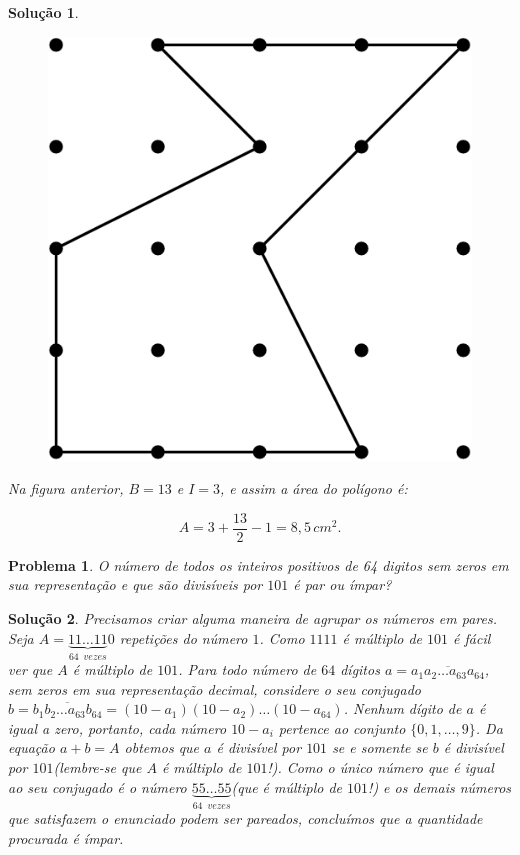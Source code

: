 \documentclass{hipatia}
\newtheorem{problem*}{Problema}
\newtheorem*{solution*}{Solução}
\begin{document}
\begin{solution*}
\begin{figure}[htbp]
	\centering
		\includegraphics[scale=0.3]{F58.png}
\end{figure} 

\noindent Na figura anterior, $B=13$ e $I=3$, e assim a área do polígono é:

$$A = 3 + \dfrac{13}{2}-1 = 8,5\,cm^2.$$ 

\end{solution*}


\begin{problem*}
O número de todos os inteiros positivos de 64 digitos sem zeros em sua representação e que são divisíveis por $101$ é par ou ímpar?
\end{problem*}

\begin{solution*}
Precisamos criar alguma maneira de agrupar os números em pares. Seja $A = \underbrace{11 \ldots 11}_{64\,\,\, vezes}0$ repetições do número $1$. Como $1111$ é múltiplo de $101$ é fácil ver que  $A$ é múltiplo de $101$. Para todo número de $64$ dígitos $a=\overline{a_1a_2\ldots a_{63}a_{64}}$, sem zeros em sua representação decimal, considere o seu conjugado $b = \overline{b_1b_2\ldots a_{63}b_{64}} = (10-a_1)(10-a_2) \ldots (10-a_{64})$. Nenhum dígito de $a$ é igual a zero, portanto, cada número $10-a_i$ pertence ao conjunto $\{0,1,\ldots, 9\}$. Da equação $a+b=A$ obtemos que $a$ é divisível por $101$ se e somente se $b$ é divisível por $101$(lembre-se que $A$ é múltiplo de $101$!). Como o único número que é igual ao seu conjugado é o número $\underbrace{55 \ldots 55}_{64\,\,\, vezes}$(que é múltiplo de $101$!) e os demais números que satisfazem o enunciado podem ser pareados, concluímos que a quantidade procurada é ímpar.    
\end{solution*}
\end{document}
